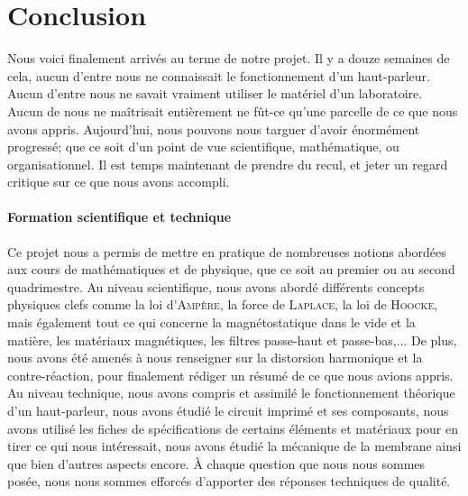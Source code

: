 

\section{Conclusion}

Nous voici finalement arrivés au terme de notre projet. Il y a douze semaines de cela, aucun 
d'entre nous ne connaissait le fonctionnement d'un haut-parleur. Aucun d'entre nous ne savait vraiment utiliser 
le matériel d'un laboratoire. Aucun de nous ne maîtrisait entièrement ne fût-ce qu'une parcelle de ce que nous 
avons appris. Aujourd'hui, nous pouvons nous targuer d'avoir énormément progressé; que ce soit d'un point de
vue scientifique, mathématique, ou organisationnel. Il est temps maintenant de prendre du recul, et jeter un 
regard critique sur ce que nous avons accompli.

\paragraph{Formation scientifique et technique}
Ce projet nous a permis de mettre en pratique de nombreuses notions abordées aux cours de mathématiques et
de physique, que ce soit au premier ou au second quadrimestre. 
Au niveau scientifique, nous avons abordé différents concepts physiques clefs comme la loi d'\textsc{Ampère},
la force de \textsc{Laplace}, la loi de \textsc{Hoocke}, mais également tout ce qui concerne la 
magnétostatique dans le vide et la matière, les matériaux magnétiques, les filtres passe-haut et passe-bas,...
De plus, nous avons été amenés à nous renseigner sur la distorsion harmonique et la contre-réaction, pour 
finalement rédiger un résumé de ce que nous avions appris.
Au niveau technique, nous avons compris et assimilé le fonctionnement théorique d’un haut-parleur, nous avons
étudié le circuit imprimé et ses composants, nous avons utilisé les fiches de spécifications de certains 
éléments et matériaux pour en tirer ce qui nous intéressait, nous avons étudié la mécanique de la membrane
ainsi que bien d'autres aspects encore.
À chaque question que nous nous sommes posée, nous nous sommes efforcés d'apporter des réponses techniques 
de qualité.

